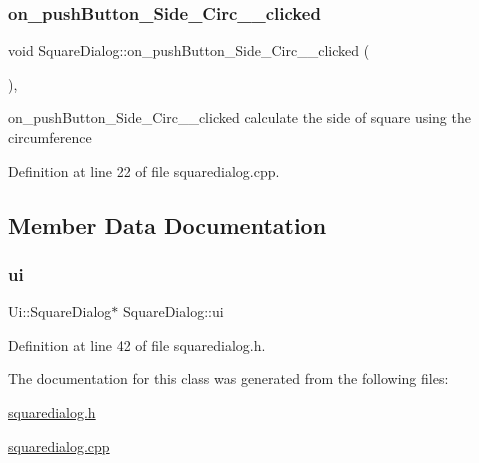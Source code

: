 \subsubsection{\texorpdfstring{on\+\_\+push\+Button\+\_\+\+Side\+\_\+\+Circ\+\_\+\+\_\+clicked}{on\_pushButton\_Side\_Circ\_\_clicked}}
{\footnotesize\ttfamily void Square\+Dialog\+::on\+\_\+push\+Button\+\_\+\+Side\+\_\+\+Circ\+\_\+\+\_\+clicked (\begin{DoxyParamCaption}{ }\end{DoxyParamCaption})\hspace{0.3cm}{\ttfamily [private]}, {\ttfamily [slot]}}



on\+\_\+push\+Button\+\_\+\+Side\+\_\+\+Circ\+\_\+\+\_\+clicked calculate the side of square using the circumference 



Definition at line 22 of file squaredialog.\+cpp.



\subsection{Member Data Documentation}
\mbox{\label{class_square_dialog_a2359f63a0ab0e9d7062b0ff2e60a7e96}} 
\subsubsection{\texorpdfstring{ui}{ui}}
{\footnotesize\ttfamily Ui\+::\+Square\+Dialog$\ast$ Square\+Dialog\+::ui\hspace{0.3cm}{\ttfamily [private]}}



Definition at line 42 of file squaredialog.\+h.



The documentation for this class was generated from the following files\+:\begin{DoxyCompactItemize}
\item 
\mbox{\hyperlink{squaredialog_8h}{squaredialog.\+h}}\item 
\mbox{\hyperlink{squaredialog_8cpp}{squaredialog.\+cpp}}\end{DoxyCompactItemize}
